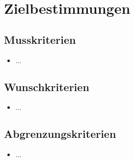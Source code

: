 
\section{Zielbestimmungen}



\subsection{Musskriterien}

\begin{itemize}
	\item ...
\end{itemize}

\subsection{Wunschkriterien}

\begin{itemize}
	\item ...
\end{itemize}

\subsection{Abgrenzungskriterien}

\begin{itemize}
	\item ...
\end{itemize}

